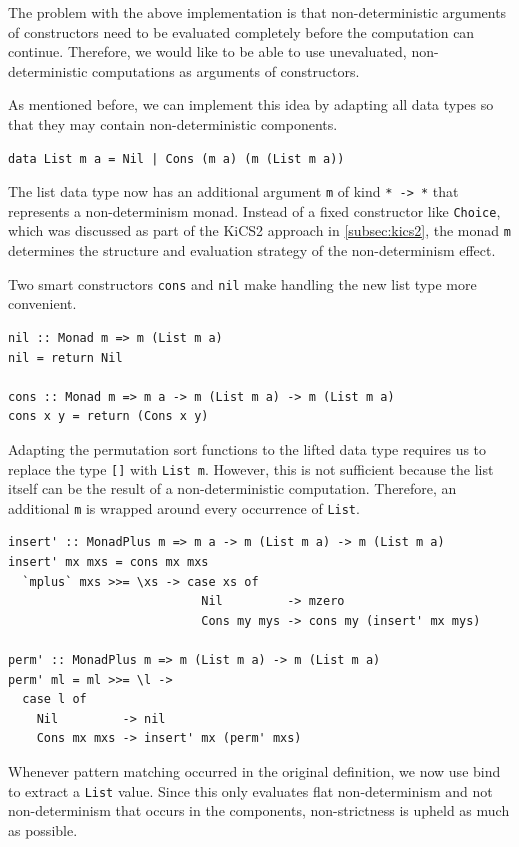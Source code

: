 \documentclass[a4paper, 11pt, fleqn, twoside, abstract=on]{scrreprt}
\newcommand{\hinl}[1]{\texttt{#1}}
\begin{document}
The problem with the above implementation is that non-deterministic arguments of constructors need to be evaluated completely before the computation can continue.
Therefore, we would like to be able to use unevaluated, non-deterministic computations as arguments of constructors.

As mentioned before, we can implement this idea by adapting all data types so that they may contain non-deterministic components.

\begin{verbatim}
data List m a = Nil | Cons (m a) (m (List m a))
\end{verbatim}
\noindent
The list data type now has an additional argument \hinl{m} of kind \hinl{* -> *} that represents a non-determinism monad.
Instead of a fixed constructor like \hinl{Choice}, which was discussed as part of the KiCS2 approach in \autoref{subsec:kics2}, the monad \hinl{m} determines the structure and evaluation strategy of the non-determinism effect.

Two smart constructors \hinl{cons} and \hinl{nil} make handling the new list type more convenient.

\begin{verbatim}
nil :: Monad m => m (List m a)
nil = return Nil

cons :: Monad m => m a -> m (List m a) -> m (List m a)
cons x y = return (Cons x y)
\end{verbatim}
\pagebreak
Adapting the permutation sort functions to the lifted data type requires us to replace the type \hinl{[]} with \hinl{List m}.
However, this is not sufficient because the list itself can be the result of a non-deterministic computation.
Therefore, an additional \hinl{m} is wrapped around every occurrence of \hinl{List}.

\begin{verbatim}
insert' :: MonadPlus m => m a -> m (List m a) -> m (List m a)
insert' mx mxs = cons mx mxs
  `mplus` mxs >>= \xs -> case xs of
                           Nil         -> mzero
                           Cons my mys -> cons my (insert' mx mys)

perm' :: MonadPlus m => m (List m a) -> m (List m a)
perm' ml = ml >>= \l ->
  case l of
    Nil         -> nil
    Cons mx mxs -> insert' mx (perm' mxs)
\end{verbatim}

Whenever pattern matching occurred in the original definition, we now use bind to extract a \hinl{List} value.
Since this only evaluates flat non-determinism and not non-determinism that occurs in the components, non-strictness is upheld as much as possible.
\end{document}
